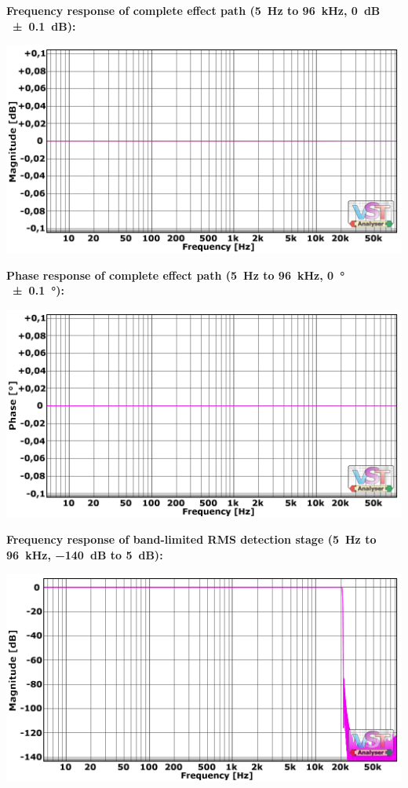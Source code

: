 \newpage %

\textbf{Frequency response of complete effect path (\SI{5}{\hertz} to
  \SI{96}{\kilo\hertz}, \SI{0}{\dB} \SI{\pm 0.1}{\dB}):}

\begin{center}
  \includegraphics[scale=0.60,clip]{include/images/fft_192khz-freq-fx_path.png}
\end{center}

\textbf{Phase response of complete effect path (\SI{5}{\hertz} to
  \SI{96}{\kilo\hertz}, \SI{0}{\degree}\,\SI{\pm 0.1}{\degree}):}

\begin{center}

\includegraphics[scale=0.60,clip]{include/images/fft_192khz-phase-fx_path.png}
\end{center}

\textbf{Frequency response of band-limited RMS detection stage
  (\SI{5}{\hertz} to \SI{96}{\kilo\hertz}, \SI{-140}{\dB} to
  \SI{5}{\dB}):}

\begin{center}
  \includegraphics[scale=0.60,clip]{include/images/fft_192khz-freq-rms.png}
\end{center}

